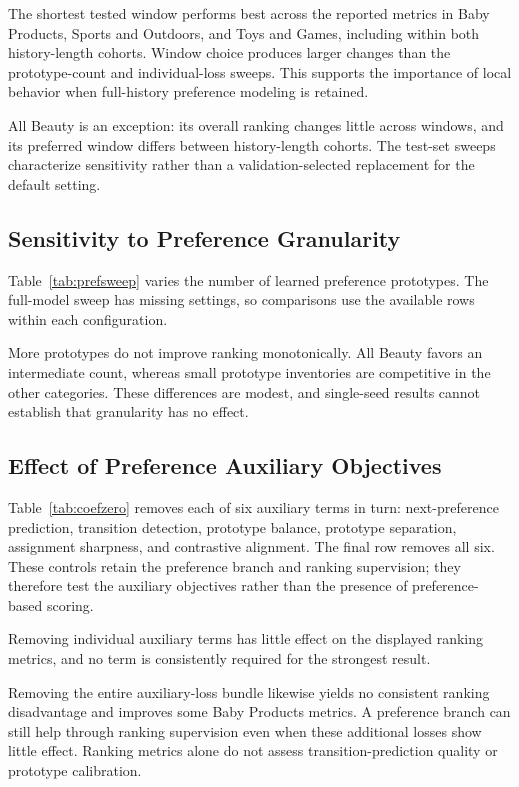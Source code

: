 \documentclass[11pt]{article}
\begin{document}
The shortest tested window performs best across the reported metrics in Baby Products, Sports and Outdoors, and Toys and Games, including within both history-length cohorts. Window choice produces larger changes than the prototype-count and individual-loss sweeps. This supports the importance of local behavior when full-history preference modeling is retained.

All Beauty is an exception: its overall ranking changes little across windows, and its preferred window differs between history-length cohorts. The test-set sweeps characterize sensitivity rather than a validation-selected replacement for the default setting.

\subsection{Sensitivity to Preference Granularity}
Table~\ref{tab:prefsweep} varies the number of learned preference prototypes. The full-model sweep has missing settings, so comparisons use the available rows within each configuration.

More prototypes do not improve ranking monotonically. All Beauty favors an intermediate count, whereas small prototype inventories are competitive in the other categories. These differences are modest, and single-seed results cannot establish that granularity has no effect.

\subsection{Effect of Preference Auxiliary Objectives}
Table~\ref{tab:coefzero} removes each of six auxiliary terms in turn: next-preference prediction, transition detection, prototype balance, prototype separation, assignment sharpness, and contrastive alignment. The final row removes all six. These controls retain the preference branch and ranking supervision; they therefore test the auxiliary objectives rather than the presence of preference-based scoring.

Removing individual auxiliary terms has little effect on the displayed ranking metrics, and no term is consistently required for the strongest result.

Removing the entire auxiliary-loss bundle likewise yields no consistent ranking disadvantage and improves some Baby Products metrics. A preference branch can still help through ranking supervision even when these additional losses show little effect. Ranking metrics alone do not assess transition-prediction quality or prototype calibration.
\end{document}
